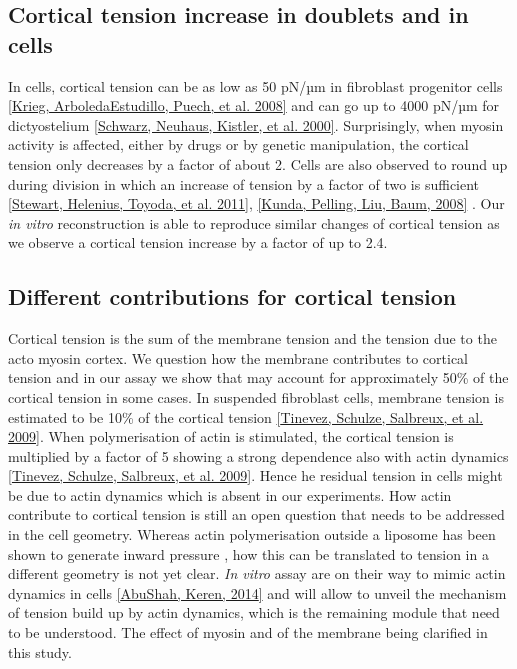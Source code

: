\documentclass[A4paperpaper,11pt,english]{sphinxmanual}
\begin{document}
\subsection{Cortical tension increase in doublets and in cells}
\label{parts/part4:cortical-tension-increase-in-doublets-and-in-cells}
In cells, cortical tension can be as low as 50 pN/µm in fibroblast progenitor
cells {\hyperref[parts/part4:krieg2008]{{[}Krieg, ArboledaEstudillo, Puech,  et al.  2008{]}}} and can go up to 4000 pN/µm for
dictyostelium {\hyperref[parts/part4:schwarz2000]{{[}Schwarz, Neuhaus, Kistler,  et al.  2000{]}}}. Surprisingly, when myosin activity is
affected, either by drugs or by genetic manipulation, the cortical tension only
decreases by a factor of about 2. Cells are also observed to round up during
division  in which an  increase of tension by a factor of two
is sufficient {\hyperref[parts/part4:stewart2011]{{[}Stewart, Helenius, Toyoda,  et al.  2011{]}}}, {\hyperref[parts/part4:kunda2008]{{[}Kunda, Pelling, Liu, Baum,  2008{]}}} .
Our \emph{in vitro} reconstruction is able to reproduce similar
changes of cortical tension as we observe a cortical tension increase by a factor of up to 2.4.


\subsection{Different contributions for cortical tension}
\label{parts/part4:different-contributions-for-cortical-tension}
Cortical tension is the sum of the membrane tension and the tension due to the
acto myosin cortex. We question how the membrane contributes to cortical tension
and in our assay we show that may account for approximately 50\% of the cortical tension in some cases.
In suspended fibroblast cells, membrane tension is estimated to be 10\% of the
cortical tension {\hyperref[parts/part4:tinevez2009]{{[}Tinevez, Schulze, Salbreux,  et al.  2009{]}}}. When polymerisation of actin is
stimulated, the cortical tension is multiplied by a factor of 5 showing a
strong dependence also with actin dynamics {\hyperref[parts/part4:tinevez2009]{{[}Tinevez, Schulze, Salbreux,  et al.  2009{]}}}. Hence he
residual tension in cells might be due to actin dynamics which is absent in our
experiments. How actin contribute to cortical tension is still an open question
that needs to be addressed in the cell geometry.  Whereas actin polymerisation
outside a liposome has been shown to generate inward pressure
, how this can be translated to tension  in a different geometry is
not yet clear. \emph{In vitro} assay are on their way to mimic actin dynamics in
cells {\hyperref[parts/part4:abushah2014]{{[}AbuShah, Keren,  2014{]}}} and will allow to unveil the mechanism of tension build up by
actin dynamics, which is the remaining module that need to be understood. The
effect of myosin and of the membrane being clarified in this study.
\end{document}
